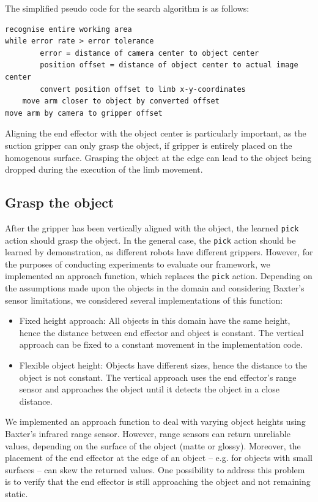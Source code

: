 The simplified pseudo code for the search algorithm is as follows:

\begin{verbatim}
recognise entire working area
while error rate > error tolerance
        error = distance of camera center to object center
        position offset = distance of object center to actual image center
        convert position offset to limb x-y-coordinates
	move arm closer to object by converted offset
move arm by camera to gripper offset
\end{verbatim}
Aligning the end effector with the object center is particularly important, as the suction gripper can only grasp the object, if gripper is entirely placed on the homogenous surface.
Grasping the object at the edge can lead to the object being dropped during the execution of the limb movement.

\subsection{Grasp the object}
After the gripper has been vertically aligned with the object, the learned \texttt{pick} action should grasp the object.
In the general case, the \texttt{pick} action should be learned by demonstration, as different robots have different grippers.
However, for the purposes of conducting experiments to evaluate our framework, we implemented an approach function, which replaces the \texttt{pick} action.
Depending on the assumptions made upon the objects in the domain and considering Baxter's sensor limitations, we considered several implementations of this function:
\begin{itemize}
\item Fixed height approach: All objects in this domain have the same height, hence the distance between end effector and object is constant.
The vertical approach can be fixed to a constant movement in the implementation code.
\item Flexible object height: Objects have different sizes, hence the distance to the object is not constant.
The vertical approach uses the end effector's range sensor and approaches the object until it detects the object in a close distance.
\end{itemize}
We implemented an approach function to deal with varying object heights using Baxter's infrared range sensor.
However, range sensors can return unreliable values, depending on the surface of the object (matte or glossy).
Moreover, the placement of the end effector at the edge of an object -- e.g.
for objects with small surfaces -- can skew the returned values.
One possibility to address this problem is to verify that the end effector is still approaching the object and not remaining static.


